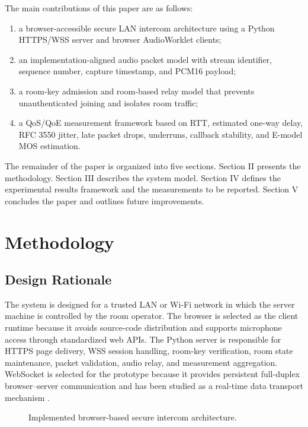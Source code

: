 \documentclass[conference]{IEEEtran}
\begin{document}
The main contributions of this paper are as follows:
\begin{enumerate}
    \item a browser-accessible secure LAN intercom architecture using a Python HTTPS/WSS server and browser AudioWorklet clients;
    \item an implementation-aligned audio packet model with stream identifier, sequence number, capture timestamp, and PCM16 payload;
    \item a room-key admission and room-based relay model that prevents unauthenticated joining and isolates room traffic;
    \item a QoS/QoE measurement framework based on RTT, estimated one-way delay, RFC 3550 jitter, late packet drops, underruns, callback stability, and E-model MOS estimation.
\end{enumerate}

The remainder of the paper is organized into five sections. Section II presents the methodology. Section III describes the system model. Section IV defines the experimental results framework and the measurements to be reported. Section V concludes the paper and outlines future improvements.

\section{Methodology}

\subsection{Design Rationale}

The system is designed for a trusted LAN or Wi-Fi network in which the server machine is controlled by the room operator. The browser is selected as the client runtime because it avoids source-code distribution and supports microphone access through standardized web APIs. The Python server is responsible for HTTPS page delivery, WSS session handling, room-key verification, room state maintenance, packet validation, audio relay, and measurement aggregation. WebSocket is selected for the prototype because it provides persistent full-duplex browser--server communication and has been studied as a real-time data transport mechanism \cite{ieee_websocket_realtime}.

\begin{figure}[H]
    \centering
    \caption{Implemented browser-based secure intercom architecture.}
    \label{fig:architecture}
\end{figure}
\end{document}
